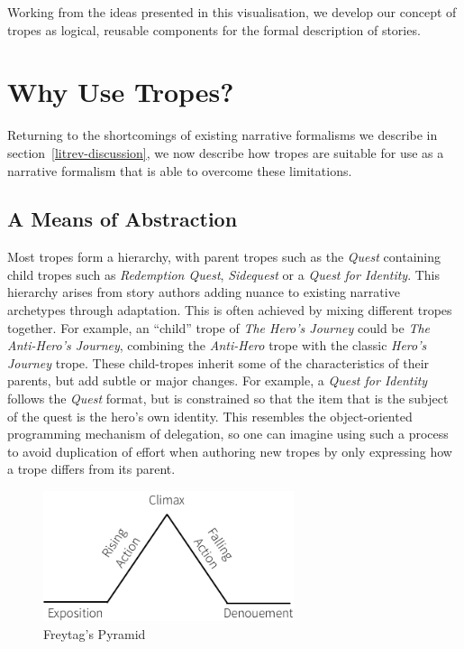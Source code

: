 \documentclass[11pt]{report}
\begin{document}
Working from the ideas presented in this visualisation, we develop our concept of tropes as
logical, reusable components for the formal description of stories. 

\section{Why Use Tropes?}

Returning to the shortcomings of existing narrative formalisms we describe in
section~\ref{litrev-discussion}, we now describe how tropes are suitable for use
as a narrative formalism that is able to overcome these limitations.

\subsection{A Means of Abstraction}
\label{sec:abstraction}
Most tropes form a hierarchy, with parent tropes such as the
\emph{Quest} containing child tropes such as \emph{Redemption Quest},
\emph{Sidequest} or a \emph{Quest for Identity}. This hierarchy arises from
story authors adding nuance to existing narrative archetypes through adaptation.
This is often achieved by mixing different tropes together. For example, an
``child'' trope of \emph{The Hero's Journey} could be \emph{The Anti-Hero's
  Journey}, combining the \emph{Anti-Hero} trope with the classic \emph{Hero's
  Journey} trope.
These child-tropes inherit some
of the characteristics of their parents, but add subtle or major changes. For
example, a \emph{Quest for Identity} follows the \emph{Quest} format, but is
constrained so that the item that is the subject of the quest is the hero's own
identity. This resembles the object-oriented programming mechanism of delegation, so one can imagine using
such a process to avoid duplication of effort when authoring new tropes by only
expressing how a trope differs from its parent.

\begin{figure}[!t]
\centerline{\includegraphics[height=1.5in]{freytag.png}}
\caption{Freytag's Pyramid} \label{fig:freytag}
\end{figure}
\end{document}
